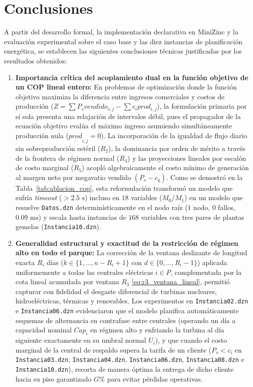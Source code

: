 \section{Conclusiones}
\label{sec:conclusiones}

A partir del desarrollo formal, la implementación declarativa en MiniZinc y la evaluación experimental sobre el caso base y las diez instancias de planificación energética, se establecen las siguientes conclusiones técnicas justificadas por los resultados obtenidos:

\begin{enumerate}
    \item \textbf{Importancia crítica del acoplamiento dual en la función objetivo de un COP lineal entero:}
    En problemas de optimización donde la función objetivo maximiza la diferencia entre ingresos comerciales y costos de producción ($Z = \sum P_s vendido_{s,j} - \sum c_i prod_{i,j}$), la formulación primaria por sí sola presenta una relajación de intervalos débil, pues el propagador de la ecuación objetivo evalúa el máximo ingreso asumiendo simultáneamente producción nula ($\underline{prod}_{i,j} = 0$). La incorporación de la igualdad de flujo diario sin sobreproducción estéril ($R_2$), la dominancia por orden de mérito a través de la frontera de régimen normal ($R_4$) y las proyecciones lineales por escalón de costo marginal ($R_5$) acopló algebraicamente el costo mínimo de generación al margen neto por megavatio vendido $(P_s - c_q)$. Como se demostró en la Tabla~\ref{tab:ablacion_cop}, esta reformulación transformó un modelo que sufría \emph{timeout} ($>2.5\text{ s}$) incluso en $18$ variables ($M_0/M_1$) en un modelo que resuelve \texttt{Datos.dzn} determinísticamente en el nodo raíz ($1$ nodo, $0$ fallos, $0.09\text{ ms}$) y escala hasta instancias de $168$ variables con tres pares de plantas gemelas (\texttt{Instancia10.dzn}).

    \item \textbf{Generalidad estructural y exactitud de la restricción de régimen alto en todo el parque:}
    La corrección de la ventana deslizante de longitud exacta $R_i$ días ($k \in \{1, \dots, n - R_i + 1\}$ con $d \in \{0, \dots, R_i - 1\}$) aplicada uniformemente a todas las centrales eléctricas $i \in P$, complementada por la cota lineal acumulada por ventana $R_3$ \eqref{eq:r3_ventana_lineal}, permitió capturar con fidelidad el desgaste diferencial de turbinas nucleares, hidroeléctricas, térmicas y renovables. Los experimentos en \texttt{Instancia02.dzn} e \texttt{Instancia06.dzn} evidenciaron que el modelo planifica automáticamente esquemas de alternancia en contrafase entre centrales (operando un día a capacidad nominal $Cap_i$ en régimen alto y enfriando la turbina al día siguiente exactamente en su umbral normal $U_i$), y que cuando el costo marginal de la central de respaldo supera la tarifa de un cliente ($P_s < c_i$ en \texttt{Instancia03.dzn}, \texttt{Instancia04.dzn}, \texttt{Instancia06.dzn}, \texttt{Instancia08.dzn} e \texttt{Instancia10.dzn}), recorta de manera óptima la entrega de dicho cliente hacia su piso garantizado $G\%$ para evitar pérdidas operativas.


\end{enumerate}
